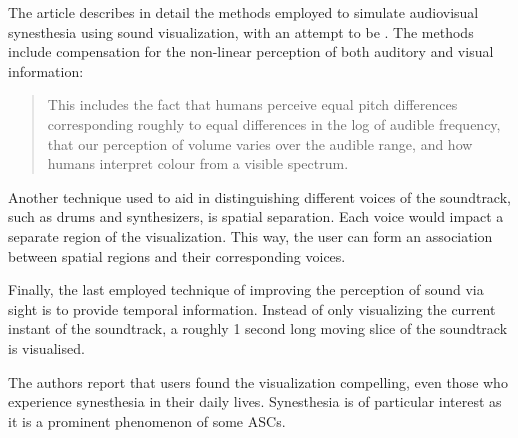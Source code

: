 The article describes in detail the methods employed to simulate audiovisual synesthesia using sound visualization, with an attempt to be . The methods include compensation for the non-linear perception of both auditory and visual information:

\begin{quote}
    This includes the fact that humans perceive equal pitch differences corresponding roughly to equal differences in the log of audible frequency, that our perception of volume varies over the audible range, and how humans interpret colour from a visible spectrum.
\end{quote}

Another technique used to aid in distinguishing different voices of the soundtrack, such as drums and synthesizers, is spatial separation. Each voice would impact a separate region of the visualization. This way, the user can form an association between spatial regions and their corresponding voices.

Finally, the last employed technique of improving the perception of sound via sight is to provide temporal information. Instead of only visualizing the current instant of the soundtrack, a roughly 1 second long moving slice of the soundtrack is visualised.

The authors report that users found the visualization compelling, even those who experience synesthesia in their daily lives. Synesthesia is of particular interest as it is a prominent phenomenon of some \acp{ASC}.

